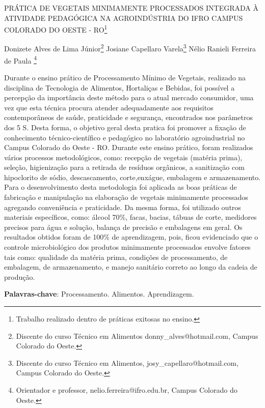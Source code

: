 \documentclass[article,12pt,onesidea,4paper,english,brazil]{abntex2}
\begin{document}
	
	
	\frenchspacing 
	
	\begin{center}
		\LARGE PRÁTICA DE VEGETAIS MINIMAMENTE PROCESSADOS INTEGRADA À ATIVIDADE PEDAGÓGICA NA AGROINDÚSTRIA DO IFRO CAMPUS COLORADO DO OESTE - RO\footnote{Trabalho realizado dentro de práticas exitosas no ensino.}
		
		\normalsize
		Donizete Alves de Lima Júnior\footnote{Discente do curso Técnico em Alimentos donny\_alves@hotmail.com, Campus Colorado do Oeste.} 
		Josiane Capellaro Varela\footnote{Discente do curso Técnico em Alimentos, josy\_capellaro@hotmail.com, Campus Colorado do Oeste.} 
		Nélio Ranieli Ferreira de Paula \footnote{Orientador e professor, nelio.ferreira@ifro.edu.br, Campus Colorado do Oeste.} 
	\end{center}
	
	\noindent Durante o ensino prático de Processamento Mínimo de Vegetais, realizado na disciplina de Tecnologia de Alimentos, Hortaliças e Bebidas, foi possível a percepção da importância deste método para o atual mercado consumidor, uma vez que esta técnica procura atender adequadamente aos requisitos contemporâneos de saúde, praticidade e segurança, encontrados nos parâmetros dos 5 S. Desta forma, o objetivo geral desta pratica foi promover a fixação de conhecimento técnico-científico e pedagógico no laboratório agroindustrial no Campus Colorado do Oeste - RO. Durante este ensino prático, foram realizados vários processos metodológicos, como: recepção de vegetais (matéria prima), seleção, higienização para a retirada de resíduos orgânicos, a sanitização com hipoclorito de sódio, descascamento, corte,enxágue, embalagem e armazenamento. Para o desenvolvimento desta metodologia foi aplicada as boas práticas de fabricação e manipulação na elaboração de vegetais minimamente processados agregando conveniência e praticidade. Da mesma forma, foi utilizado outros materiais específicos, como: álcool 70\%, facas, bacias, tábuas de corte, medidores precisos para água e solução, balança de precisão e embalagens em geral.  Os resultados obtidos foram de 100\% de aprendizagem, pois, ficou evidenciado que o controle microbiológico dos produtos minimamente processados envolve fatores tais como: qualidade da matéria prima, condições de processamento, de embalagem, de armazenamento, e manejo sanitário correto ao longo da cadeia de produção.
	
	\vspace{\onelineskip}
	
	\noindent
	\textbf{Palavras-chave}: Processamento. Alimentos. Aprendizagem.
	
\end{document}
